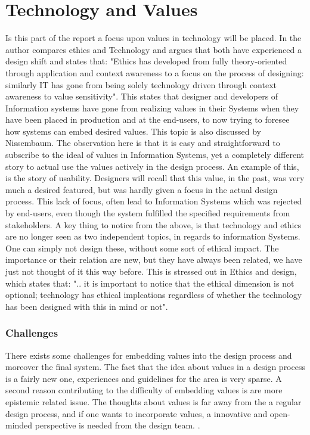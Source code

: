 
\section{Technology and Values}
Is this part of the report a focus upon values in technology will be placed. In  the author compares ethics and Technology and argues that both have experienced a design shift and states that: "Ethics has developed from fully theory-oriented through application and context awareness to a focus on the process of designing: similarly IT has gone from being solely technology driven through context awareness to value sensitivity". This states that designer and developers of Information systems have gone from realizing values in their Systems when they have been placed in production and at the end-users, to now trying to foresee how systems can embed desired values. This topic is also discussed by Nissembaum. The observation here is that it is easy and straightforward to subscribe to the ideal of values in Information Systems, yet a completely different story to actual use the values actively in the design process. An example of this, is the story of usability. Designers will recall that this value, in the past, was very much a desired featured, but was hardly given a focus in the actual design process. This lack of focus, often lead to Information Systems which was rejected by end-users, even though the system fulfilled the specified requirements from stakeholders. %
A key thing to notice from the above, is that technology and ethics are no longer seen as two independent topics, in regards to information Systems. One can simply not design these, without some sort of ethical impact. The importance or their relation are new, but they have always been related, we have just not thought of it this way before. This is stressed out in Ethics and design, which states that: ".. it is important to notice that the ethical dimension is not optional; technology has ethical implcations regardless of whether the technology has been designed with this in mind or not". 

\subsubsection{Challenges}
There exists some challenges for embedding values into the design process and moreover the final system. The fact that the idea about values in a design process is a fairly new one, experiences and guidelines for the area is very sparse. A second reason  contributing to the difficulty of embedding values is are more epistemic related issue. The thoughts about values is far away from the a regular design process, and if one wants to incorporate values, a innovative and open-minded perspective is needed from the design team. . 


